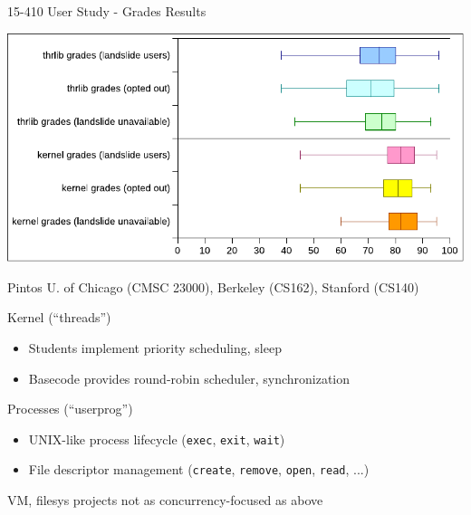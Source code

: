\documentclass[xcolor=dvipsnames]{beamer}
\begin{document}
\begin{frame}{15-410 User Study - Grades Results} %
	\begin{center}
		\includegraphics[width=\textwidth]{../p2-p3-distribution.pdf}
	\end{center}
\end{frame}


\begin{frame}{Pintos}
	U. of Chicago (CMSC 23000), Berkeley (CS162), Stanford (CS140)
	\linegap

	Kernel (``threads'')
	\begin{itemize}
		\item Students implement priority scheduling, sleep
		\item Basecode provides round-robin scheduler, synchronization
	\end{itemize}
	\linegap

	Processes (``userprog'')
	\begin{itemize}
		\item UNIX-like process lifecycle ({\tt exec}, {\tt exit}, {\tt wait})
		\item File descriptor management ({\tt create}, {\tt remove}, {\tt open}, {\tt read}, ...)
	\end{itemize}
	\linegap

	VM, filesys projects not as concurrency-focused as above
\end{frame}
\end{document}
